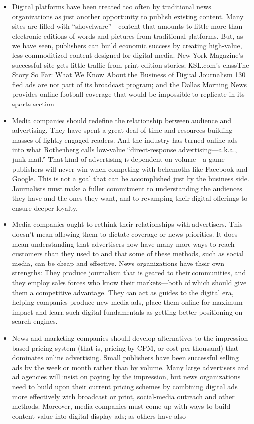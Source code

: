 \begin{itemize}
\item Digital platforms have been treated too often by traditional news organizations
as just another opportunity to publish existing content. Many sites are
filled with ``shovelware''—content that amounts to little more than electronic
editions of words and pictures from traditional platforms. But, as we
have seen, publishers can build economic success by creating high-value,
less-commoditized content designed for digital media. New York Magazine’s
successful site gets little traffic from print-edition stories; KSL.com’s classThe
Story So Far: What We Know About the Business of Digital Journalism
130
fied ads are not part of its broadcast program; and the Dallas Morning News
provides online football coverage that would be impossible to replicate in its
sports section.
\item Media companies should redefine the relationship between audience and
advertising. They have spent a great deal of time and resources building
masses of lightly engaged readers. And the industry has turned online ads
into what Rothenberg calls low-value ``direct-response advertising—a.k.a.,
junk mail.'' That kind of advertising is dependent on volume—a game publishers
will never win when competing with behemoths like Facebook and
Google. This is not a goal that can be accomplished just by the business side.
Journalists must make a fuller commitment to understanding the audiences
they have and the ones they want, and to revamping their digital offerings to
ensure deeper loyalty.
\item Media companies ought to rethink their relationships with advertisers. This
doesn’t mean allowing them to dictate coverage or news priorities. It does
mean understanding that advertisers now have many more ways to reach
customers than they used to and that some of these methods, such as social
media, can be cheap and effective. News organizations have their own
strengths: They produce journalism that is geared to their communities, and
they employ sales forces who know their markets—both of which should
give them a competitive advantage. They can act as guides to the digital era,
helping companies produce new-media ads, place them online for maximum
impact and learn such digital fundamentals as getting better positioning
on search engines.
\item News and marketing companies should develop alternatives to the impression-
based pricing system (that is, pricing by CPM, or cost per thousand)
that dominates online advertising. Small publishers have been successful
selling ads by the week or month rather than by volume. Many large advertisers
and ad agencies will insist on paying by the impression, but news
organizations need to build upon their current pricing schemes by combining
digital ads more effectively with broadcast or print, social-media
outreach and other methods. Moreover, media companies must come up
with ways to build content value into digital display ads; as others have also


\end{itemize}
